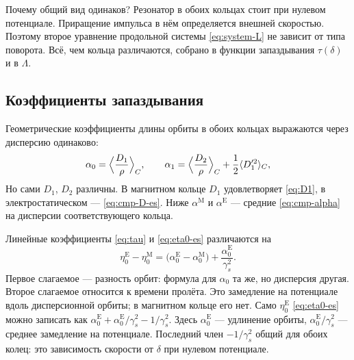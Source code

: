 Почему общий вид одинаков? Резонатор в обоих кольцах стоит при нулевом потенциале. Приращение импульса в нём определяется внешней скоростью. Поэтому второе уравнение продольной системы \eqref{eq:system-L} не зависит от типа поворота. Всё, чем кольца различаются, собрано в функции запаздывания $\tau(\delta)$ и в $\Lambda$.

\subsection{Коэффициенты запаздывания}

Геометрические коэффициенты длины орбиты в обоих кольцах выражаются через дисперсию одинаково:
\begin{equation}
\label{eq:cmp-alpha}
\alpha_0=\Bigl\langle\frac{D_1}{\rho}\Bigr\rangle_C,
\qquad
\alpha_1=\Bigl\langle\frac{D_2}{\rho}\Bigr\rangle_C+\frac12\langle D_1'^2\rangle_C,
\end{equation}
Но сами $D_1$, $D_2$ различны. В магнитном кольце $D_1$ удовлетворяет \eqref{eq:D1}, в электростатическом --- \eqref{eq:cmp-D-es}. Ниже $\alpha^{\mathrm{M}}$ и $\alpha^{\mathrm{E}}$ --- средние \eqref{eq:cmp-alpha} на дисперсии соответствующего кольца.

Линейные коэффициенты \eqref{eq:tau} и \eqref{eq:eta0-es} различаются на
\begin{equation}
\label{eq:cmp-eta0-diff}
\eta_0^{\mathrm{E}}-\eta_0^{\mathrm{M}}
=\bigl(\alpha_0^{\mathrm{E}}-\alpha_0^{\mathrm{M}}\bigr)
+\frac{\alpha_0^{\mathrm{E}}}{\gamma_s^2}.
\end{equation}
Первое слагаемое --- разность орбит: формула для $\alpha_0$ та же, но дисперсия другая. Второе слагаемое относится к времени пролёта. Это замедление на потенциале вдоль дисперсионной орбиты; в магнитном кольце его нет. Само $\eta_0^{\mathrm{E}}$ \eqref{eq:eta0-es} можно записать как $\alpha_0^{\mathrm{E}}+\alpha_0^{\mathrm{E}}/\gamma_s^2-1/\gamma_s^2$. Здесь $\alpha_0^{\mathrm{E}}$ --- удлинение орбиты, $\alpha_0^{\mathrm{E}}/\gamma_s^2$ --- среднее замедление на потенциале. Последний член $-1/\gamma_s^2$ общий для обоих колец: это зависимость скорости от $\delta$ при нулевом потенциале.

